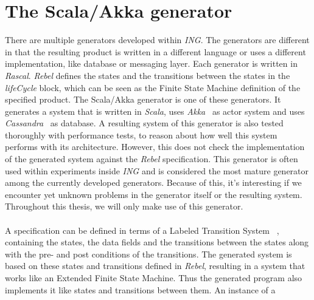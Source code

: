 \section{The Scala/Akka generator}
There are multiple generators developed within \textit{ING}. The generators are
different in that the resulting product is written in a different language or
uses a different implementation, like database or messaging layer. Each
generator is written in \textit{Rascal}. \textit{Rebel} defines the states and
the transitions between the states in the \textit{lifeCycle} block, which can be
seen as the Finite State Machine definition of the specified product. The
Scala/Akka generator is one of these generators. It generates a system that is
written in \textit{Scala}, uses \textit{Akka}~\cite{siteAkka2017} as actor
system and uses \textit{Cassandra}~\cite{siteCassandra2016} as database. A resulting
system of this generator is also tested thoroughly with performance tests, to
reason about how well this system performs with its architecture. However, this
does not check the implementation of the generated system against the
\textit{Rebel} specification. This generator is often used within experiments
inside \textit{ING} and is considered the most mature generator among the
currently developed generators. Because of this, it's interesting if we
encounter yet unknown problems in the generator itself or the resulting system.
Throughout this thesis, we will only make use of this generator.\\
\\
A specification can be defined in terms of a Labeled Transition
System~\cite{stoel2016solving}%
, containing the states, the data fields and the transitions between the states
along with the pre- and post conditions of the transitions. The generated system
is based on these states and transitions defined in \textit{Rebel}, resulting in
a system that works like an Extended Finite State Machine. Thus the generated program
also implements it like states and transitions between them. An instance of a
